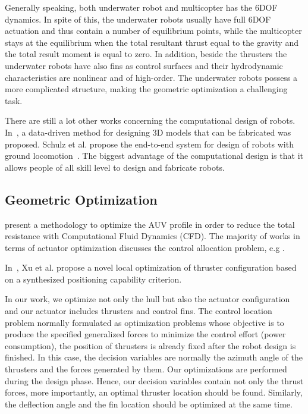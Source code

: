 Generally speaking, both underwater robot and multicopter has the 6DOF dynamics. In spite of this, the underwater robots usually have full 6DOF actuation and thus contain a number of equilibrium points, while the multicopter stays at the equilibrium when the total resultant thrust equal to the gravity and the total result moment is equal to zero. In addition, beside the thrusters the underwater robots have also fins as control surfaces and their hydrodynamic characteristics are nonlinear and of high-order. The underwater robots possess a more complicated structure, making the geometric optimization a challenging task.

There are still a lot other works concerning the computational design of robots. In~\cite{Schulz2014}, a data-driven method for designing 3D models that can be fabricated was proposed. Schulz et al. propose the end-to-end system for design of robots with ground locomotion~\cite{Schulz2017}. The biggest advantage of the computational design is that it allows people of all skill level to design and fabricate robots.   

\subsection{Geometric Optimization}
\cite{JOUNG201244} present a methodology to optimize the AUV profile in order to reduce the total resistance with Computational Fluid Dynamics (CFD). The majority of works in terms of actuator optimization discusses the control allocation problem, e.g \cite{Fossen2008,Johansen2004,Johansen2005}.

In~\cite{XU20151044}, Xu et al. propose a novel local optimization of thruster configuration based on a synthesized  positioning  capability  criterion.

In our work, we optimize not only the hull but also the actuator configuration and our actuator includes thrusters and control fins. The control location problem normally formulated as optimization problems whose objective is to produce the specified generalized forces to minimize the control effort (power consumption), the position of thrusters is already fixed after the robot design is finished. In this case, the decision variables are normally the azimuth angle of the thrusters and the forces generated by them. Our optimizations are performed during the design phase. Hence, our decision variables contain not only the thrust forces, more importantly, an optimal thruster location should be found. Similarly, the deflection angle and the fin location should be optimized at the same time. 

